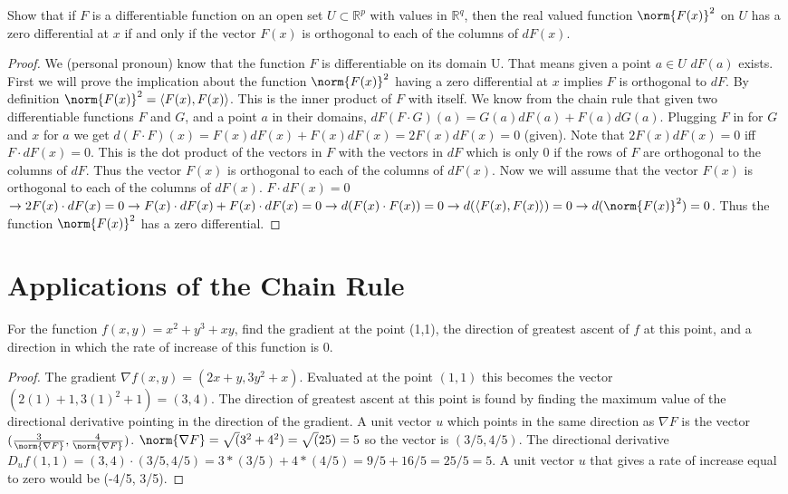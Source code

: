 \documentclass[12pt]{book}
\newcommand{\R}{\mathbb{R}}
\newenvironment{exercise}[2][Exercise]{\begin{trivlist}
\item[\hskip \labelsep {\bfseries #1}\hskip \labelsep {\bfseries #2.}]}{\end{trivlist}}
\begin{document}
\begin{exercise}{9.3.11} Show that if $F$ is a differentiable function on an open set $U\subset \R^p$ with values in $\R^q$, then the real valued function $\norm{F(x)}^2$ on $U$ has a zero differential at $x$ if and only if the vector $F(x)$ is orthogonal to each of the columns of $dF(x)$.
\begin{proof}
We (personal pronoun) know that the function $F$ is differentiable on its domain U. That means given a point $a \in U$ $dF(a)$ exists. First we will prove the implication about the function $\norm{F(x)}^2$ having a zero differential at $x$ implies $F$ is orthogonal to $dF$. By definition $\norm{F(x)}^2 = \langle F(x), F(x) \rangle$. This is the inner product of $F$ with itself. We know from the chain rule that given two differentiable functions $F$ and $G$, and a point $a$ in their domains, $dF(F\cdot G)(a) = G(a)dF(a) + F(a)dG(a)$. Plugging $F$ in for $G$ and $x$ for $a$ we get $d(F\cdot F)(x) = F(x)dF(x) + F(x)dF(x) = 2F(x)dF(x) = 0$ (given). Note that $2F(x)dF(x) = 0$ iff $F \cdot dF(x) = 0$. This is the dot product of the vectors in $F$ with the vectors in $dF$ which is only $0$ if the rows of $F$ are orthogonal to the columns of $dF$. Thus the vector $F(x)$ is orthogonal to each of the columns of $dF(x)$.
Now we will assume that the vector $F(x)$ is orthogonal to each of the columns of $dF(x)$. $F \cdot dF(x) = 0$ $\to 2F(x)\cdot dF(x) = 0 \to F(x)\cdot dF(x) + F(x)\cdot dF(x) = 0 \to d(F(x)\cdot F(x)) = 0 \to d(\langle F(x),F(x)\rangle) = 0 \to d(\norm{F(x)}^2) = 0$. Thus the function $\norm{F(x)}^2$ has a zero differential. 
\end{proof}
\end{exercise}



\section{Applications of the Chain Rule}

\begin{exercise}{9.4.2} For the function $f(x,y) = x^2 + y^3 + xy$, find the gradient at the point (1,1), the direction of greatest ascent of $f$ at this point, and a direction in which the rate of increase of this function is 0.

\begin{proof} 
The gradient $\nabla f(x,y) = (2x + y, 3y^2 + x)$. Evaluated at the point $(1,1)$ this becomes the vector $(2(1) + 1, 3(1)^2 + 1) = (3, 4)$. The direction of greatest ascent at this point is found by finding the maximum value of the directional derivative pointing in the direction of the gradient. A unit vector $u$ which points in the same direction as $\nabla F$ is the vector $(\frac{3}{\norm{\nabla F}}, \frac{4}{\norm{\nabla F}})$. $\norm{\nabla F} = \sqrt(3^2 + 4^2) = \sqrt(25) = 5$ so the vector is $(3/5, 4/5)$. The directional derivative $D_uf(1,1) = (3,4) \cdot (3/5, 4/5) = 3*(3/5) + 4*(4/5) = 9/5 + 16/5 = 25/5 = 5$. 
A unit vector $u$ that gives a rate of increase equal to zero would be (-4/5, 3/5). 
\end{proof}
\end{exercise}
\end{document}
